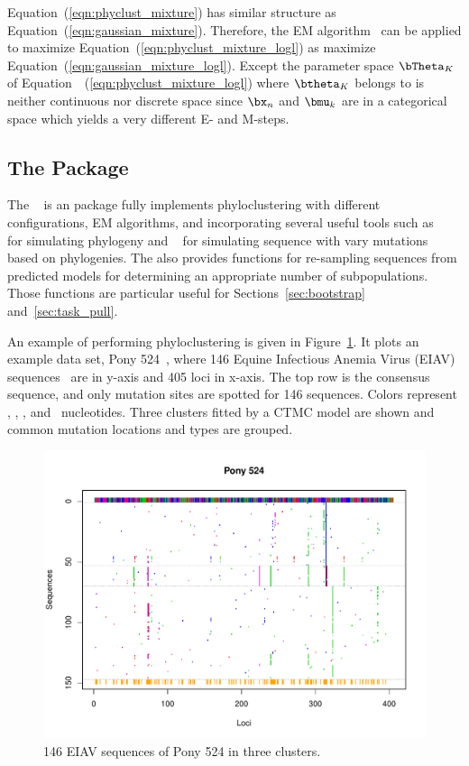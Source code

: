 \begin{enumerate}
\end{enumerate}

Equation~(\ref{eqn:phyclust_mixture}) has similar structure
as Equation~(\ref{eqn:gaussian_mixture}). Therefore, the
EM algorithm~\citep{Dempster1977}
can be applied to maximize Equation~(\ref{eqn:phyclust_mixture_logl})
as maximize Equation~(\ref{eqn:gaussian_mixture_logl}).
Except the parameter space $\bTheta_K$ of
Equation~~(\ref{eqn:phyclust_mixture_logl}) where $\btheta_K$ belongs to
is neither continuous nor discrete space since $\bx_n$ and $\bmu_k$ are
in a categorical space which yields a very different E- and M-steps.


\subsection{The  Package}

The ~\citep{Chen2011a}
is an  package fully implements
phyloclustering with different configurations, EM algorithms, and
incorporating several useful tools such as ~\citep{Hudson2002}
for simulating phylogeny and ~\citep{Rambaut1997}
for simulating sequence with vary mutations based on phylogenies.
The  also provides functions for re-sampling sequences from
predicted models for determining an appropriate number of subpopulations.
Those functions are particular useful for Sections~\ref{sec:bootstrap}
and~\ref{sec:task_pull}.

An example of  performing phyloclustering is given in
Figure~\ref{fig:eiav}.
It plots an example data set, Pony 524~\citep{Carpenter2011},
where 146 Equine Infectious Anemia Virus (EIAV) sequences~\citep{Leroux2004}
are in y-axis and 405 loci in x-axis.
The top row is the consensus sequence, and only mutation sites are spotted
for 146 sequences. Colors represent , , , and
 \ nucleotides. Three clusters fitted by a CTMC model are shown and
common mutation locations and types are grouped.
\begin{figure}[h!tb]
\centering
 \includegraphics[width=6in]{pbdDEMO-include/pics/pony524}
\caption{146 EIAV sequences of Pony 524
in three clusters.}
\label{fig:eiav}
\end{figure}




